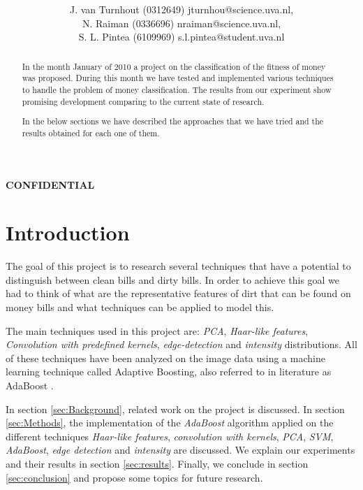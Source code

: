\documentclass[11pt,twocolumn]{article}
\title{\tbf{Dirty Money:}\\\tbf{Feature selection using AdaBoost}}
\author{J. van Turnhout (0312649) jturnhou@science.uva.nl, 
	 \\ N. Raiman (0336696) nraiman@science.uva.nl, 
	 \\ S. L. Pintea (6109969) s.l.pintea@student.uva.nl}
\begin{document}
\begin{titlepage}
	\maketitle
	\vspace*{250px}
	\centering
	\large{\textbf{CONFIDENTIAL}}
 \end{titlepage}

	
	\begin{abstract}
		In the month January of 2010 a project on the classification of
		the fitness of money was proposed. During this month we have tested and
		implemented various techniques to handle the problem of money classification.
		The results from our experiment show promising development comparing to the
		current state of research.
		
		In the below sections we have described the approaches that we
		have tried and the results obtained for each one of them.
	\end{abstract}
	
	\section{Introduction}
		The goal of this project is to research several techniques that have a potential to distinguish between clean bills and dirty bills. In order to achieve this goal we had to think of what are the representative features of dirt that can be found on money bills and what techniques can be applied to model this.
		 		
		The main techniques used in this project are: \emph{PCA}, \emph{Haar-like features}, \emph{Convolution with predefined kernels}, \emph{edge-detection} and \emph{intensity} distributions. All of these techniques have been analyzed on the image data using a machine learning technique called Adaptive Boosting, also referred to in literature as AdaBoost \cite{Ada}.
		
		In section \ref{sec:Background}, related work on the project is discussed. In section \ref{sec:Methods}, the implementation of the \emph{AdaBoost} algorithm applied on the different techniques \emph{Haar-like features}, \emph{convolution with kernels}, \emph{PCA}, \emph{SVM}, \emph{AdaBoost}, \emph{edge detection} and \emph{intensity} are discussed. We explain our experiments and their results in section \ref{sec:results}. Finally, we conclude in section \ref{sec:conclusion} and propose some topics for future research.
\end{document}
